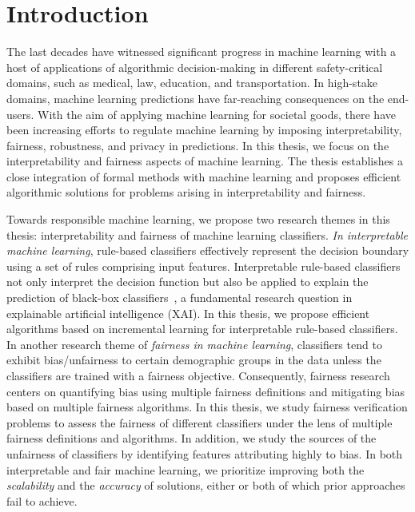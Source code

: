 \chapter{Introduction}

The last decades have witnessed significant progress in machine learning with a host of applications of algorithmic decision-making in different safety-critical domains, such as medical, law, education, and transportation. In high-stake domains,  machine learning predictions have far-reaching consequences on the end-users. With the aim of applying machine learning for societal goods, there have been increasing efforts to regulate machine learning by imposing interpretability, fairness, robustness, and privacy in predictions. In this thesis, we focus on the interpretability and fairness aspects of machine learning. The thesis establishes a close integration of formal methods with machine learning and proposes efficient algorithmic solutions for problems arising in interpretability and fairness.

Towards responsible machine learning, we propose two research themes in this thesis: interpretability and fairness of machine learning classifiers. \emph{In interpretable machine learning}, rule-based classifiers effectively represent the decision boundary using a set of rules comprising input features. Interpretable rule-based classifiers not only interpret the decision function but also be applied to explain the prediction of black-box classifiers~\cite{gill2020responsible,lundberg2017unified,moradi2021post,ribeiro2016should,slack2020fooling}, a fundamental research question in explainable artificial intelligence (XAI). In this thesis, we propose efficient algorithms based on incremental learning for interpretable rule-based classifiers. In another research theme of \emph{fairness in machine learning}, classifiers tend to exhibit bias/unfairness to certain demographic groups in the data unless the classifiers are trained with a fairness objective. Consequently, fairness research centers on quantifying bias using multiple fairness definitions and mitigating bias based on multiple fairness algorithms. In this thesis, we study fairness verification problems to assess the fairness of different classifiers under the lens of multiple fairness definitions and algorithms. In addition, we study the sources of the unfairness of classifiers by identifying  features attributing highly to bias. In both interpretable and fair machine learning, we prioritize improving both the \emph{scalability} and the \emph{accuracy} of solutions, either or both of which prior approaches fail to achieve. 




